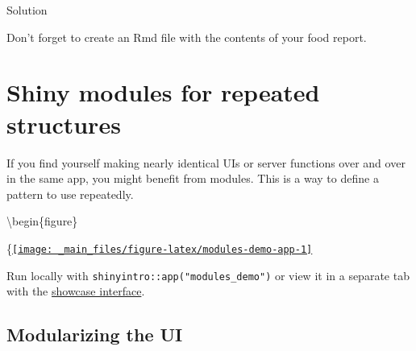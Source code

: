 \documentclass[
]{book}
\newenvironment{Shaded}{\begin{snugshade}}{\end{snugshade}}
\newcommand{\AttributeTok}[1]{\textcolor[rgb]{0.77,0.63,0.00}{#1}}
\newcommand{\CommentTok}[1]{\textcolor[rgb]{0.56,0.35,0.01}{\textit{#1}}}
\newcommand{\ControlFlowTok}[1]{\textcolor[rgb]{0.13,0.29,0.53}{\textbf{#1}}}
\newcommand{\DocumentationTok}[1]{\textcolor[rgb]{0.56,0.35,0.01}{\textbf{\textit{#1}}}}
\newcommand{\FunctionTok}[1]{\textcolor[rgb]{0.00,0.00,0.00}{#1}}
\newcommand{\NormalTok}[1]{#1}
\newcommand{\OtherTok}[1]{\textcolor[rgb]{0.56,0.35,0.01}{#1}}
\newcommand{\SpecialCharTok}[1]{\textcolor[rgb]{0.00,0.00,0.00}{#1}}
\newcommand{\StringTok}[1]{\textcolor[rgb]{0.31,0.60,0.02}{#1}}
\begin{document}
Solution

Don't forget to create an Rmd file with the contents of your food report.

\begin{Shaded}
\end{Shaded}

\hypertarget{modules}{%
\chapter{Shiny modules for repeated structures}\label{modules}}

If you find yourself making nearly identical UIs or server functions over and over in the same app, you might benefit from modules. This is a way to define a pattern to use repeatedly.

\textbackslash begin\{figure\}

\{\centering \href{https://shiny.psy.gla.ac.uk/debruine/modules_demo/}{\texttt{[image: \_main\_files/figure-latex/modules-demo-app-1]} }

Run locally with \texttt{shinyintro::app("modules\_demo")} or view it in a separate tab with the \href{https://shiny.psy.gla.ac.uk/debruine/modules_demo/}{showcase interface}.

\hypertarget{modularizing-the-ui}{%
\section{Modularizing the UI}\label{modularizing-the-ui}}
\end{document}
